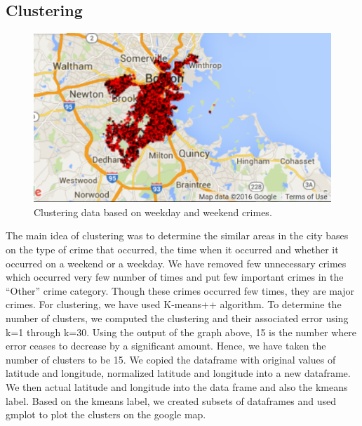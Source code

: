 \documentclass[journal, a4paper]{IEEEtran}
\begin{document}
\subsection{Clustering}
    \begin{figure}[!hbt]
        \begin{center}
        \includegraphics[width=\columnwidth]{boston-cluster-day.png}
        \caption{Clustering data based on weekday and weekend crimes.}
        \label{fig:tf_plot}
        \end{center}
    \end{figure}

The main idea of clustering was to determine the similar areas in the city bases on the type of crime that occurred, the time when it occurred and whether it occurred on a weekend or a weekday. We have removed few unnecessary crimes which occurred very few number of times and put few important crimes in the “Other” crime category. Though these crimes occurred few times, they are major crimes.
For clustering, we have used K-means++ algorithm. To determine the number of clusters, we computed the clustering and their associated error using k=1 through k=30. Using the output of the graph above, 15 is the number where error ceases to decrease by a significant amount. Hence, we have taken the number of clusters to be 15. 
We copied the dataframe with original values of latitude and longitude, normalized latitude and longitude into a new dataframe. We then actual latitude and longitude into the data frame and also the kmeans label. Based on the kmeans label, we created subsets of dataframes and used gmplot to plot the clusters on the google map.
\end{document}
